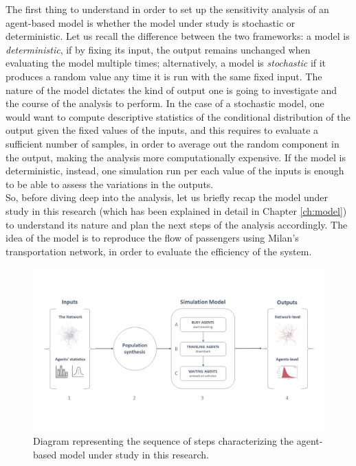 The first thing to understand in order to set up the sensitivity analysis of an agent-based model is whether the model under study is stochastic or deterministic. Let us recall the difference between the two frameworks: a model is \textit{deterministic}, if by fixing its input, the output remains unchanged when evaluating the model multiple times; alternatively, a model is \textit{stochastic} if it produces a random value any time it is run with the same fixed input. The nature of the model dictates the kind of output one is going to investigate and the course of the analysis to perform. In the case of a stochastic model, one would want to compute descriptive statistics of the conditional distribution of the output given the fixed values of the inputs, and this requires to evaluate a sufficient number of samples, in order to average out the random component in the output, making the analysis more computationally expensive. If the model is deterministic, instead, one simulation run per each value of the inputs is enough to be able to assess the variations in the outputs. \\ So, before diving deep into the analysis, let us briefly recap the model under study in this research (which has been explained in detail in Chapter \ref{ch:model}) to understand its nature and plan the next steps of the analysis accordingly. The idea of the model is to reproduce the flow of passengers using Milan's transportation network, in order to evaluate the efficiency of the system.
\begin{figure}
    \centering
    \includegraphics[width = \textwidth]{tex/pics/model_ppt2.jpg}
    \caption{Diagram representing the sequence of steps characterizing the agent-based model under study in this research.}
    \label{fig:model_schema}
\end{figure}
